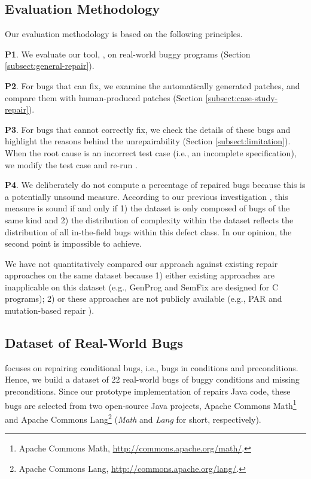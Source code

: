 \subsection{Evaluation Methodology}
\label{subsect:methodology}

Our evaluation methodology is based on the following principles. 

\textbf{P1}. We evaluate our tool, \nopol, on real-world buggy programs (Section \ref{subsect:general-repair}). 

\textbf{P2}. For bugs that \nopol can fix, we examine the automatically generated patches, and compare them with human-produced patches (Section \ref{subsect:case-study-repair}). 

\textbf{P3}. For bugs that \nopol cannot correctly fix, we check the details of these bugs and highlight the reasons behind the unrepairability (Section \ref{subsect:limitation}). When the root cause is an incorrect test case (i.e., an incomplete specification), we modify the test case and re-run \nopol.

\textbf{P4}. We deliberately do not compute a percentage of repaired bugs because this is a potentially unsound measure. According to our previous investigation \cite{monperrus2014critical}, this measure is sound if and only if 1) the dataset is only composed of bugs of the same kind and 2) the distribution of complexity within the dataset reflects the distribution of all in-the-field bugs within this defect class. In our opinion, the second point is impossible to achieve.

We have not quantitatively compared our approach against existing repair approaches on the same dataset because
1) either existing approaches are inapplicable on this dataset (e.g., GenProg \cite{le2012genprog} and SemFix \cite{nguyen2013semfix} are designed for C programs);
2) or these approaches are not publicly available (e.g., PAR \cite{Kim2013} and mutation-based repair \cite{debroy2010using}).

\subsection{Dataset of Real-World Bugs}
\label{subsect:data-set}

\nopol focuses on repairing conditional bugs, i.e., bugs in \ourif conditions and preconditions. Hence, we build a dataset of 22 real-world bugs of buggy \ourif conditions and missing preconditions. Since our prototype implementation of \nopol repairs Java code, these \numbug bugs are selected from two open-source Java projects, Apache Commons Math\footnote{Apache Commons Math, \url{http://commons.apache.org/math/}.} and Apache Commons Lang\footnote{Apache Commons Lang, \url{http://commons.apache.org/lang/}.} (\textit{Math} and \textit{Lang} for short, respectively).  

